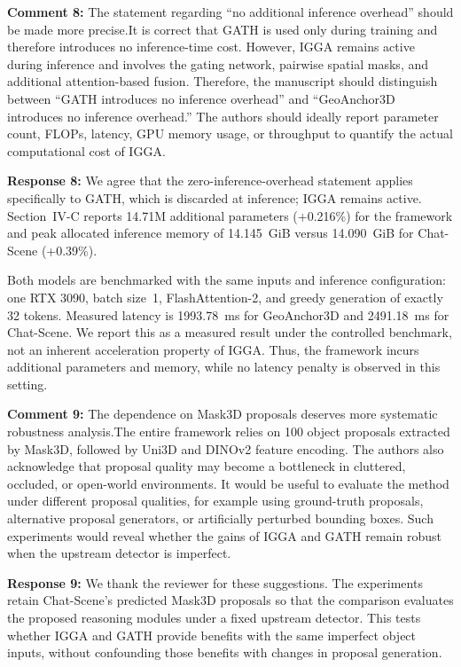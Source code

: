 {\noindent\color{comment}
\textbf{Comment 8:}
The statement regarding ``no additional inference overhead'' should be made more precise.It is correct that GATH is used only during training and therefore introduces no inference-time cost.  However, IGGA remains active during inference and involves the gating network, pairwise spatial masks, and additional attention-based fusion. Therefore, the manuscript should distinguish between ``GATH introduces no inference overhead'' and ``GeoAnchor3D introduces no inference overhead.'' The authors should ideally report parameter count, FLOPs, latency, GPU memory usage, or throughput to quantify the actual computational cost of IGGA.
}\vspace{\comafter}

\noindent\textbf{Response 8:}
We agree that the zero-inference-overhead statement applies specifically to GATH, which is discarded at inference; IGGA remains active. Section~IV-C reports 14.71M additional parameters (+0.216\%) for the framework and peak allocated inference memory of 14.145~GiB versus 14.090~GiB for Chat-Scene (+0.39\%).

Both models are benchmarked with the same inputs and inference configuration: one RTX 3090, batch size~1, FlashAttention-2, and greedy generation of exactly 32 tokens. Measured latency is 1993.78~ms for GeoAnchor3D and 2491.18~ms for Chat-Scene. We report this as a measured result under the controlled benchmark, not an inherent acceleration property of IGGA. Thus, the framework incurs additional parameters and memory, while no latency penalty is observed in this setting.
\vspace{\resafter}


{\noindent\color{comment}
\textbf{Comment 9:}
The dependence on Mask3D proposals deserves more systematic robustness analysis.The entire framework relies on 100 object proposals extracted by Mask3D, followed by Uni3D and DINOv2 feature encoding.  The authors also acknowledge that proposal quality may become a bottleneck in cluttered, occluded, or open-world environments.  It would be useful to evaluate the method under different proposal qualities, for example using ground-truth proposals, alternative proposal generators, or artificially perturbed bounding boxes. Such experiments would reveal whether the gains of IGGA and GATH remain robust when the upstream detector is imperfect.
}\vspace{\comafter}

\noindent\textbf{Response 9:}
We thank the reviewer for these suggestions. The experiments retain Chat-Scene's predicted Mask3D proposals so that the comparison evaluates the proposed reasoning modules under a fixed upstream detector. This tests whether IGGA and GATH provide benefits with the same imperfect object inputs, without confounding those benefits with changes in proposal generation.

